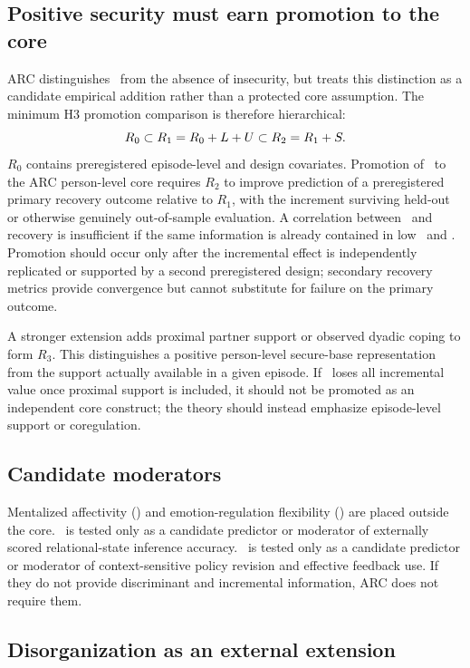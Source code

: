 \subsection{Positive security must earn promotion to the core}

ARC distinguishes \Sec\ from the absence of insecurity, but treats this distinction as a candidate empirical addition rather than a protected core assumption. The minimum H3 promotion comparison is therefore hierarchical:
\[
R_0
\subset
R_1=R_0+L+U
\subset
R_2=R_1+S.
\]
\(R_0\) contains preregistered episode-level and design covariates. Promotion of \Sec\ to the ARC person-level core requires \(R_2\) to improve prediction of a preregistered primary recovery outcome relative to \(R_1\), with the increment surviving held-out or otherwise genuinely out-of-sample evaluation. A correlation between \Sec\ and recovery is insufficient if the same information is already contained in low \Anx\ and \Avo. Promotion should occur only after the incremental effect is independently replicated or supported by a second preregistered design; secondary recovery metrics provide convergence but cannot substitute for failure on the primary outcome.

A stronger extension adds proximal partner support or observed dyadic coping to form \(R_3\). This distinguishes a positive person-level secure-base representation from the support actually available in a given episode. If \Sec\ loses all incremental value once proximal support is included, it should not be promoted as an independent core construct; the theory should instead emphasize episode-level support or coregulation.

\subsection{Candidate moderators}

Mentalized affectivity (\MentAff) and emotion-regulation flexibility (\Flex) are placed outside the core. \MentAff\ is tested only as a candidate predictor or moderator of externally scored relational-state inference accuracy. \Flex\ is tested only as a candidate predictor or moderator of context-sensitive policy revision and effective feedback use. If they do not provide discriminant and incremental information, ARC does not require them.

\subsection{Disorganization as an external extension}

